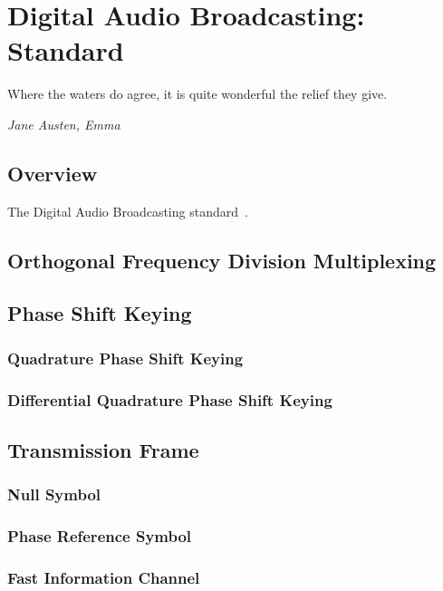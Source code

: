 \documentclass[class=report,11pt,crop=false]{standalone}
\begin{document}
\chapter{Digital Audio Broadcasting: Standard}
\epigraph{Where the waters do agree, it is quite wonderful the relief they give.}%
{\emph{Jane Austen, Emma}}

\section{Overview}
The Digital Audio Broadcasting standard~\cite{dabstandard}.

\blindtext

\section{Orthogonal Frequency Division Multiplexing}
\blindtext

\section{Phase Shift Keying}
\subsection{Quadrature Phase Shift Keying}
\subsection{Differential Quadrature Phase Shift Keying}
\blindtext

\section{Transmission Frame}
\blindtext

\subsection{Null Symbol}
\blindtext

\subsection{Phase Reference Symbol}
\blindtext

\subsection{Fast Information Channel}
\blindtext
\end{document}
